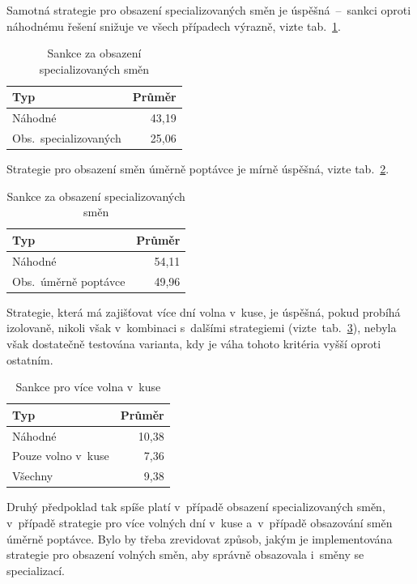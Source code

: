 \documentclass[a4paper,11pt,openany,twoside]{book}
\begin{document}
Samotná strategie pro obsazení specializovaných směn je úspěšná~–~sankci oproti náhodnému řešení snižuje ve všech případech výrazně, vizte tab.~\ref{tab:specialized}.

\begin{table}[h]
	\centering
	\caption{Sankce za obsazení specializovaných směn}
	\label{tab:specialized}
	\begin{tabular}{lr}
		\hline
		\textbf{Typ} & \textbf{Průměr}\\
		\hline
		\rowcolor{Gray}
		Náhodné & 43,19\\
		Obs.~specializovaných & 25,06 \\
		\hline
	\end{tabular}
\end{table}

Strategie pro obsazení směn úměrně poptávce je mírně úspěšná, vizte tab.~\ref{tab:demand}.

\begin{table}[h]
	\centering
	\caption{Sankce za obsazení specializovaných směn}
	\label{tab:demand}
	\begin{tabular}{lr}
		\hline
		\textbf{Typ} & \textbf{Průměr}\\
		\hline
		\rowcolor{Gray}
		Náhodné & 54,11\\
		Obs.~úměrně poptávce & 49,96 \\
		\hline
	\end{tabular}
\end{table}

Strategie, která má zajišťovat více dní volna v~kuse, je úspěšná, pokud probíhá izolovaně, nikoli však v~kombinaci s~dalšími strategiemi (vizte~tab.~\ref{tab:free}), nebyla však dostatečně testována varianta, kdy je váha tohoto kritéria vyšší oproti ostatním.

\begin{table}[h]
	\centering
	\caption{Sankce pro více volna v~kuse}
	\label{tab:free}
	\begin{tabular}{lr}
		\hline
		\textbf{Typ} & \textbf{Průměr}\\
		\hline
		\rowcolor{Gray}
		Náhodné & 10,38\\
		Pouze volno v~kuse & 7,36 \\
		\rowcolor{Gray}
		Všechny & 9,38\\
		\hline
	\end{tabular}
\end{table}


Druhý předpoklad tak spíše platí v~případě obsazení specializovaných směn, v~případě strategie pro více volných dní v~kuse a~v~případě obsazování směn úměrně poptávce. Bylo by třeba zrevidovat způsob, jakým je implementována strategie pro obsazení volných směn, aby správně obsazovala i~směny se specializací.%
\end{document}
